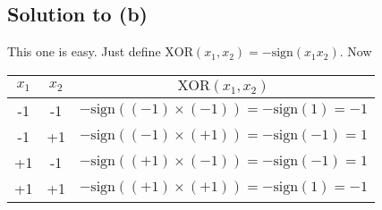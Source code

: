 \documentclass[10pt]{article}
\begin{document}
\subsection*{Solution to (b)}
This one is easy. Just define $\text{XOR}(x_1, x_2) = -\text{sign}(x_1x_2)$. Now
\begin{center}
\begin{tabular}{|c|c|c|}
\hline
$x_1$ & $x_2$ & $\text{XOR}(x_1, x_2)$ \\
\hline
-1 & -1 & $-\text{sign}((-1) \times (-1)) = -\text{sign}(1) = -1$ \\
-1 & +1 & $-\text{sign}((-1) \times (+1)) = -\text{sign}(-1) = 1$ \\
+1 & -1 & $-\text{sign}((+1) \times (-1)) = -\text{sign}(-1) = 1$ \\
+1 & +1 & $-\text{sign}((+1) \times (+1)) = -\text{sign}(1) = -1$ \\
\hline
\end{tabular}
\end{center}
\end{document}
